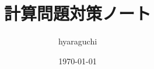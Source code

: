 \documentclass[10pt]{jsarticle}%
\begin{document}
\title{計算問題対策ノート}
\author{hyaraguchi}
\date{\today}
\maketitle


\tableofcontents%

\newpage










\begin{comment}
\newpage

\begin{thebibliography}{1}%
  \bibitem[過去問]{過去問} 公益社団法人 日本アクチュアリー会 資格試験過去問題集 \url{https://www.actuaries.jp/lib/collection/} (最終閲覧日：2023/12/10)
  \bibitem[教科書]{教科書} 日本アクチュアリー会『損保数理』(日本アクチュアリー会, 2011)
  \bibitem[モデリング]{モデリング} 日本アクチュアリー会『モデリング』(日本アクチュアリー会, 2005)
  \bibitem[リスク・セオリー]{リスク・セオリー} 岩沢宏和『リスク・セオリーの基礎』(培風館, 2010)
  \bibitem[アク数学シリーズ]{アク数学シリーズ} 岩沢宏和, 黒田耕嗣『アクチュアリー数学シリーズ4 損害保険数理』(日本評論社, 2015)
  \bibitem[ストラテジー]{ストラテジー} MAH, 平井卓也, 玉岡一史『アクチュアリー試験 合格へのストラテジー 損保数理』(東京図書, 2019)
  \bibitem[例題で学ぶ]{例題で学ぶ} 小暮雅一, 東出純『例題で学ぶ損害保険数理 第2版』(共立出版, 2016)
  \bibitem[難問題の系統]{難問題の系統}CAR他「難問題の系統とその解き方 損保数理」\url{}(最終閲覧日：2023/12/10)
  \bibitem[弱点克服]{弱点克服} 藤田岳彦『弱点克服 大学生の確率・統計』(東京図書, 2010)
  \bibitem[数研微積分]{数研微積分} 加藤文元『大学教養 微分積分』(数研出版, 2019)
\end{thebibliography}
\end{comment}
\end{document}
